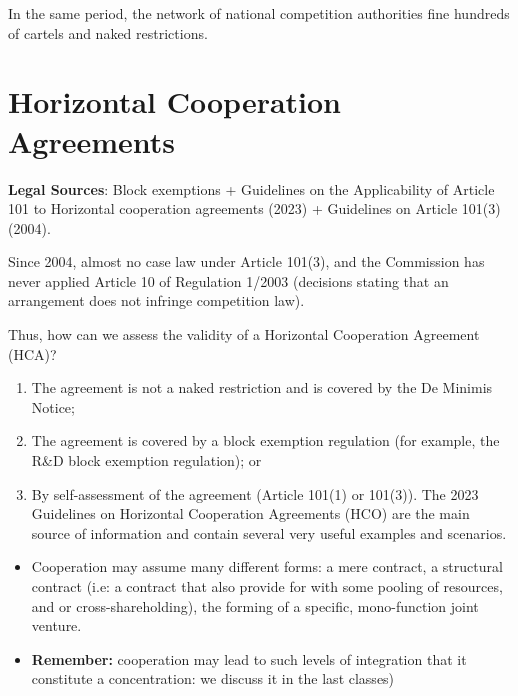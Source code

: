             In the same period, the network of national competition authorities fine hundreds of cartels and naked restrictions.

\section{Horizontal Cooperation Agreements}

    \textbf{Legal Sources}: Block exemptions + Guidelines on the Applicability of Article 101 to Horizontal cooperation agreements (2023) + Guidelines on Article 101(3) (2004).
    
    Since 2004, almost no case law under Article 101(3), and the Commission has never applied Article 10 of Regulation 1/2003 (decisions stating that an arrangement does not infringe competition law).
    
    Thus, how can we assess the validity of a Horizontal Cooperation Agreement (HCA)?
    \begin{enumerate}[label=\alph*)]
        \item The agreement is not a naked restriction and is covered by the De Minimis Notice;
        \item The agreement is covered by a block exemption regulation (for example, the R\&D block exemption regulation); or
        \item By self-assessment of the agreement (Article 101(1) or 101(3)). The 2023 Guidelines on Horizontal Cooperation Agreements (HCO) are the main source of information and contain several very useful examples and scenarios.
    \end{enumerate}
    

    \begin{itemize}
        \item Cooperation may assume many different forms: a mere contract, a structural contract (i.e: a contract that also provide for with some pooling of resources, and or cross-shareholding), the forming of a specific, mono-function joint venture.
        \item \textbf{Remember:} cooperation may lead to such levels of integration that it constitute a concentration: we discuss it in the last classes)
    \end{itemize}

